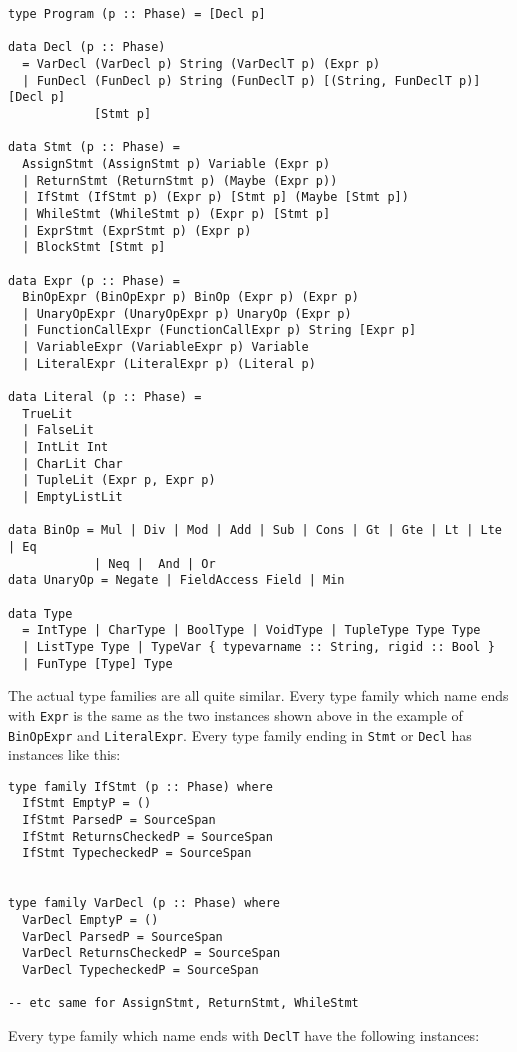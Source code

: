 \documentclass{report}
\begin{document}
\begin{verbatim}
type Program (p :: Phase) = [Decl p]

data Decl (p :: Phase)
  = VarDecl (VarDecl p) String (VarDeclT p) (Expr p)
  | FunDecl (FunDecl p) String (FunDeclT p) [(String, FunDeclT p)] [Decl p] 
            [Stmt p]  

data Stmt (p :: Phase) =
  AssignStmt (AssignStmt p) Variable (Expr p)
  | ReturnStmt (ReturnStmt p) (Maybe (Expr p))
  | IfStmt (IfStmt p) (Expr p) [Stmt p] (Maybe [Stmt p])
  | WhileStmt (WhileStmt p) (Expr p) [Stmt p]
  | ExprStmt (ExprStmt p) (Expr p)
  | BlockStmt [Stmt p]

data Expr (p :: Phase) =
  BinOpExpr (BinOpExpr p) BinOp (Expr p) (Expr p)
  | UnaryOpExpr (UnaryOpExpr p) UnaryOp (Expr p)
  | FunctionCallExpr (FunctionCallExpr p) String [Expr p]
  | VariableExpr (VariableExpr p) Variable
  | LiteralExpr (LiteralExpr p) (Literal p)

data Literal (p :: Phase) =
  TrueLit
  | FalseLit
  | IntLit Int
  | CharLit Char
  | TupleLit (Expr p, Expr p)
  | EmptyListLit

data BinOp = Mul | Div | Mod | Add | Sub | Cons | Gt | Gte | Lt | Lte | Eq 
            | Neq |  And | Or
data UnaryOp = Negate | FieldAccess Field | Min

data Type
  = IntType | CharType | BoolType | VoidType | TupleType Type Type
  | ListType Type | TypeVar { typevarname :: String, rigid :: Bool }
  | FunType [Type] Type  
\end{verbatim}

\noindent The actual type families are all quite similar. Every type family which name ends with \texttt{Expr} is the same as the two instances shown above in the example of \texttt{BinOpExpr} and \texttt{LiteralExpr}. Every type family ending in \texttt{Stmt} or \texttt{Decl} has instances like this:

\begin{verbatim}
type family IfStmt (p :: Phase) where
  IfStmt EmptyP = ()
  IfStmt ParsedP = SourceSpan
  IfStmt ReturnsCheckedP = SourceSpan
  IfStmt TypecheckedP = SourceSpan
  

type family VarDecl (p :: Phase) where
  VarDecl EmptyP = ()
  VarDecl ParsedP = SourceSpan
  VarDecl ReturnsCheckedP = SourceSpan
  VarDecl TypecheckedP = SourceSpan
  
-- etc same for AssignStmt, ReturnStmt, WhileStmt
\end{verbatim}

\noindent Every type family which name ends with \texttt{DeclT} have the following instances:
\end{document}

